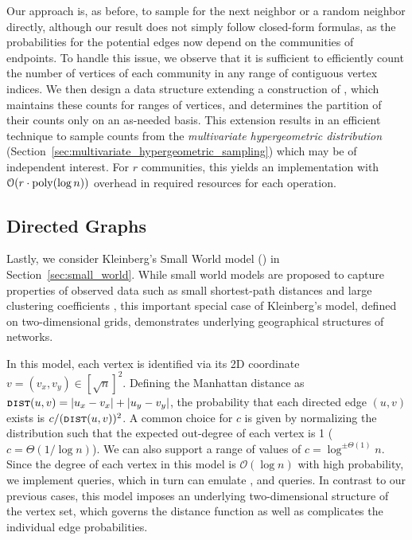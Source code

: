 Our approach is, as before, to sample for the next neighbor or a random neighbor directly,
although our result does not simply follow closed-form formulas,
as the probabilities for the potential edges now depend on the communities of endpoints.
To handle this issue, we observe that it is sufficient to efficiently count
the number of vertices of each community in any range of contiguous vertex indices.
We then design a data structure extending a construction of \cite{huge}, which maintains these counts for ranges of vertices,
and determines the partition of their counts only on an as-needed basis.
This extension results in an efficient technique to sample counts from the \emph{multivariate hypergeometric distribution}
(Section~\ref{sec:multivariate_hypergeometric_sampling}) which may be of independent interest.
For $r$ communities, this yields an implementation with $ \mathcal{O}(r\cdot \mathrm{poly}(\log n))$ overhead in required resources for each operation.




\subsection{Directed Graphs}
\label{sec:directed_graphs}
Lastly, we consider Kleinberg's Small World model (\cite{kleinberg, klein}) in Section~\ref{sec:small_world}.
While small world models are proposed to capture properties of observed data such as small shortest-path
distances and large clustering coefficients \cite{watts1998collective},
this important special case of Kleinberg's model, defined on two-dimensional grids, demonstrates underlying geographical structures of networks.

In this model, each vertex is identified via its 2D coordinate $v = (v_x, v_y) \in [\sqrt{n}]^2$.
Defining the Manhattan distance as $\texttt{\textsc{dist}}(u,v)=|u_x-v_x|+|u_y-v_y|$,
the probability that each directed edge $(u,v)$ exists is $c/(\texttt{\textsc{dist}}(u,v))^{2}$.
A common choice for $c$ is given by normalizing the distribution such that the expected out-degree of each vertex is 1 ($c = \Theta(1/\log n)$).
We can also support a range of values of $c=\log^{\pm\Theta(1)}n$.
Since the degree of each vertex in this model is $\mathcal O(\log n)$ with high probability, we implement  queries,
which in turn can emulate ,  and  queries.
In contrast to our previous cases, this model imposes an underlying two-dimensional structure of the vertex set,
which governs the distance function as well as complicates the individual edge probabilities.

